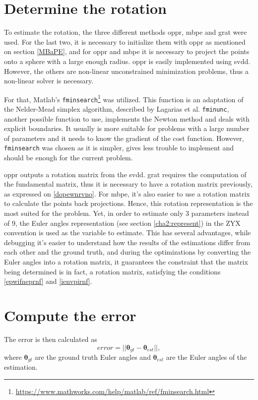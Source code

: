 \section{Determine the rotation}
To estimate the rotation, the three different methods \acrshort{oppr}, \acrshort{mbpe} and \acrshort{grat} were used. For the last two, it is necessary to initialize them with \acrshort{oppr} as mentioned on section \ref{MBaPE}, and for \acrshort{oppr} and \acrshort{mbpe} it is necessary to project the points onto a sphere with a large enough radius. \acrshort{oppr} is easily implemented using \acrshort{svdd}. However, the others are non-linear unconstrained minimization problems, thus a non-linear solver is necessary. 

For that, Matlab's \texttt{fminsearch}\footnote{\href{https://www.mathworks.com/help/matlab/ref/fminsearch.html}{https://www.mathworks.com/help/matlab/ref/fminsearch.html}} was utilized. This function is an adaptation of the Nelder-Mead simplex algorithm, described by Lagarias et al. \cite{lagarias} \texttt{fminunc}, another possible function to use, implements the Newton method and deals with explicit boundaries. It usually is more suitable for problems with a large number of parameters and it needs to know the gradient of the cost function. However, \texttt{fminsearch} was chosen as it is simpler, gives less trouble to implement and should be enough for the current problem.

\acrshort{oppr} outputs a rotation matrix from the \acrshort{svdd}.
\acrshort{grat} requires the computation of the fundamental matrix, thus it is necessary to have a rotation matrix previously, as expressed on \ref{dopewnrvno}. For \acrshort{mbpe}, it's also easier to use a rotation matrix to calculate the points back projections. Hence, this rotation representation is the most suited for the problem. Yet, in order to estimate only 3 parameters instead of 9, the Euler angles representation (see section \ref{cha2:represent}) in the ZYX convention is used as the variable to estimate. This has several advantages, while debugging it's easier to understand how the results of the estimations differ from each other and the ground truth, and during the optimizations by converting the Euler angles into a rotation matrix, it guarantees the constraint that the matrix being determined is in fact, a rotation matrix, satisfying the conditions \ref{epwifneprnf} and \ref{ienvpirnf}.

\section{Compute the error}
The error is then calculated as
\begin{equation}
	error = ||{\mathbf{ \theta}_{gt}-\mathbf{ \theta}_{est}}||,
	\label{firenr}
\end{equation}
where $\mathbf{ \theta}_{gt}$ are the ground truth Euler angles and $\mathbf{ \theta}_{est}$ are the Euler angles of the estimation.


